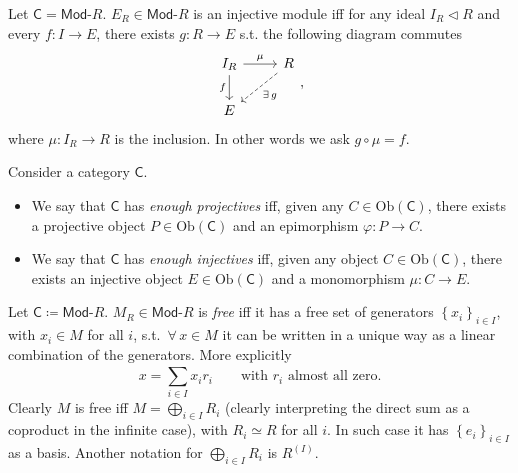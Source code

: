 \begin{prop}
	Let $\mathsf{C} = \mathsf{Mod}\text{-}R$.
	$E_R \in \mathsf{Mod}\text{-}R$ is an injective module iff
	for any ideal $I_R \triangleleft R$ and every $f\colon I \to E$, there exists $g\colon R \to E$ s.t.
	the following diagram commutes
	 \begin{equation}
	\begin{tikzcd}
		I_R \arrow[r, "\mu", rightarrow] \arrow[d, "f"', rightarrow] &
		R \arrow[ld, "\exists\, g", dashrightarrow] \\
		E &
	\end{tikzcd}
	,\end{equation} 
	where $\mu\colon I_R \to R$ is the inclusion.
	In other words we ask $g \circ \mu = f$.
\end{prop} 

\begin{defn}
	Consider a category $\mathsf{C}$.
	\begin{itemize}
		\item We say that $\mathsf{C}$ has {\em enough projectives} iff,
	given any $C \in \mathrm{Ob} \left(\mathsf{C}\right)$, 
	there exists a projective object $P \in \mathrm{Ob} \left(\mathsf{C}\right)$ and an epimorphism $\varphi\colon P \to C$.
	\item We say that $\mathsf{C}$ has {\em enough injectives} iff, 
		given any object $C \in \mathrm{Ob} \left(\mathsf{C}\right)$,
		there exists an injective object $E \in \mathrm{Ob} \left(\mathsf{C}\right)$ and a monomorphism
		$\mu\colon C \to E$.
	\end{itemize}
\end{defn}

\begin{defn}
	Let $\mathsf{C} \coloneqq \mathsf{Mod}\text{-}R$.
	$M_R \in \mathsf{Mod}\text{-}R$ is {\em free} iff it has a free set of generators $\left\{ x_i \right\}_{i \in I}$, 
	with $x_i \in M$ for all $i$, s.t. $\,\forall\, x \in M$ it can be written in a unique way as a linear combination of the generators.
	More explicitly
	\begin{equation}
	x = \sum_{i \in I}^{} x_i r_i \qquad \text{with } r_i \text{ almost all zero}
	.\end{equation} 
	Clearly $M$ is free iff $M = \bigoplus_{i \in I}R_i$
	(clearly interpreting the direct sum as a coproduct in the infinite case),
	with $R_i \simeq R$ for all $i$.
	In such case it has $\left\{ e_i \right\}_{i \in I}$ as a basis.
	Another notation for $\bigoplus_{i \in I} R_i$ is $R^{(I)}$.
\end{defn}

